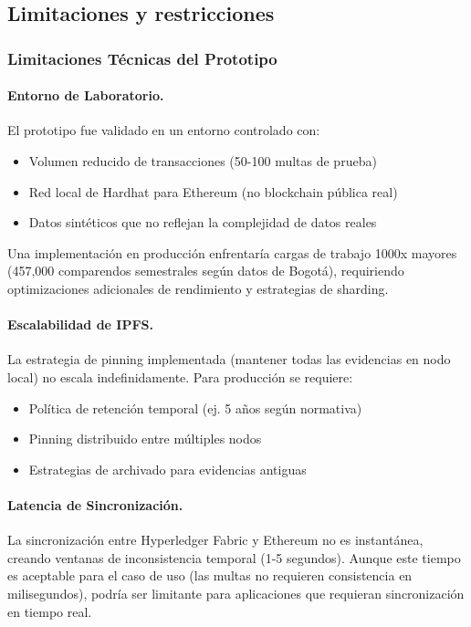 \subsection{Limitaciones y restricciones}

\subsubsection{Limitaciones Técnicas del Prototipo}

\paragraph{Entorno de Laboratorio.}
El prototipo fue validado en un entorno controlado con:
\begin{itemize}
    \item Volumen reducido de transacciones (50-100 multas de prueba)
    \item Red local de Hardhat para Ethereum (no blockchain pública real)
    \item Datos sintéticos que no reflejan la complejidad de datos reales
\end{itemize}

Una implementación en producción enfrentaría cargas de trabajo 1000x mayores (457,000 comparendos semestrales según datos de Bogotá), requiriendo optimizaciones adicionales de rendimiento y estrategias de sharding.

\paragraph{Escalabilidad de IPFS.}
La estrategia de pinning implementada (mantener todas las evidencias en nodo local) no escala indefinidamente. Para producción se requiere:
\begin{itemize}
    \item Política de retención temporal (ej. 5 años según normativa)
    \item Pinning distribuido entre múltiples nodos
    \item Estrategias de archivado para evidencias antiguas
\end{itemize}

\paragraph{Latencia de Sincronización.}
La sincronización entre Hyperledger Fabric y Ethereum no es instantánea, creando ventanas de inconsistencia temporal (1-5 segundos). Aunque este tiempo es aceptable para el caso de uso (las multas no requieren consistencia en milisegundos), podría ser limitante para aplicaciones que requieran sincronización en tiempo real.

